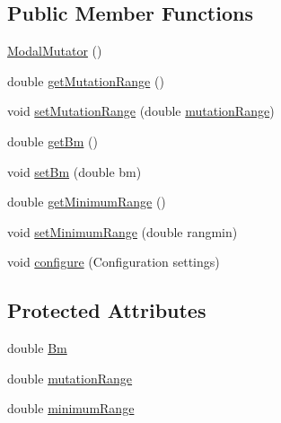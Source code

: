 \subsection*{Public Member Functions}
\begin{DoxyCompactItemize}
\item 
\hyperlink{classnet_1_1sf_1_1jclec_1_1realarray_1_1mut_1_1_modal_mutator_a9d9e0946872177a2bbde463a43dfda0f}{Modal\-Mutator} ()
\item 
double \hyperlink{classnet_1_1sf_1_1jclec_1_1realarray_1_1mut_1_1_modal_mutator_a1f1dad05808bc258358a73a59c0bee56}{get\-Mutation\-Range} ()
\item 
void \hyperlink{classnet_1_1sf_1_1jclec_1_1realarray_1_1mut_1_1_modal_mutator_a8b6bad910df3f1dfc0d6372859a76246}{set\-Mutation\-Range} (double \hyperlink{classnet_1_1sf_1_1jclec_1_1realarray_1_1mut_1_1_modal_mutator_a17b95fc4286f6efc3a3eeac3e7d7e989}{mutation\-Range})
\item 
double \hyperlink{classnet_1_1sf_1_1jclec_1_1realarray_1_1mut_1_1_modal_mutator_a7795823f1373043b20b8d3e057e366a5}{get\-Bm} ()
\item 
void \hyperlink{classnet_1_1sf_1_1jclec_1_1realarray_1_1mut_1_1_modal_mutator_ade3ec8bab092ac44acc7e7d1a5a94975}{set\-Bm} (double bm)
\item 
double \hyperlink{classnet_1_1sf_1_1jclec_1_1realarray_1_1mut_1_1_modal_mutator_ad934bdf5ffe4e7530026409d3256aad6}{get\-Minimum\-Range} ()
\item 
void \hyperlink{classnet_1_1sf_1_1jclec_1_1realarray_1_1mut_1_1_modal_mutator_ac3450fdc8d1326cba9b0ef7c6abcb359}{set\-Minimum\-Range} (double rangmin)
\item 
void \hyperlink{classnet_1_1sf_1_1jclec_1_1realarray_1_1mut_1_1_modal_mutator_a1c00f49cbbba5f4409fb40ad17906699}{configure} (Configuration settings)
\end{DoxyCompactItemize}
\subsection*{Protected Attributes}
\begin{DoxyCompactItemize}
\item 
double \hyperlink{classnet_1_1sf_1_1jclec_1_1realarray_1_1mut_1_1_modal_mutator_a5c45cb963875e79adfac82a81c184960}{Bm}
\item 
double \hyperlink{classnet_1_1sf_1_1jclec_1_1realarray_1_1mut_1_1_modal_mutator_a17b95fc4286f6efc3a3eeac3e7d7e989}{mutation\-Range}
\item 
double \hyperlink{classnet_1_1sf_1_1jclec_1_1realarray_1_1mut_1_1_modal_mutator_aaebd51ca8680281d4562f8164323b8ac}{minimum\-Range}
\end{DoxyCompactItemize}
